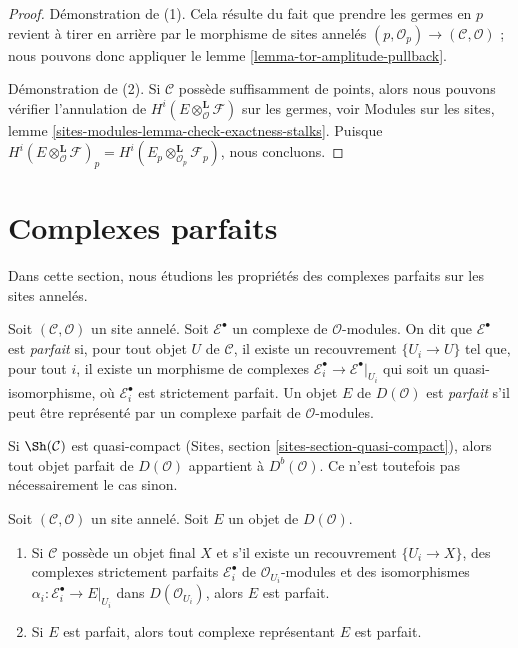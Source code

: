\begin{proof}
Démonstration de (1). Cela résulte du fait que prendre les germes en $p$
revient à tirer en arrière par le morphisme de sites annelés
$(p, \mathcal{O}_p) \to (\mathcal{C}, \mathcal{O})$ ; nous pouvons donc
appliquer le lemme \ref{lemma-tor-amplitude-pullback}.

\medskip\noindent
Démonstration de (2). Si $\mathcal{C}$ possède suffisamment de points, alors
nous pouvons vérifier l'annulation de
$H^i(E \otimes_\mathcal{O}^\mathbf{L} \mathcal{F})$
sur les germes, voir Modules sur les sites, lemme
\ref{sites-modules-lemma-check-exactness-stalks}. Puisque
$H^i(E \otimes_\mathcal{O}^\mathbf{L} \mathcal{F})_p =
H^i(E_p \otimes_{\mathcal{O}_p}^\mathbf{L} \mathcal{F}_p)$, nous concluons.
\end{proof}










\section{Complexes parfaits}
\label{section-perfect}

\noindent
Dans cette section, nous étudions les propriétés des complexes parfaits sur
les sites annelés.

\begin{definition}
\label{definition-perfect}
Soit $(\mathcal{C}, \mathcal{O})$ un site annelé. Soit
$\mathcal{E}^\bullet$ un complexe de $\mathcal{O}$-modules. On dit que
$\mathcal{E}^\bullet$ est {\it parfait} si, pour tout objet $U$ de
$\mathcal{C}$, il existe un recouvrement $\{U_i \to U\}$ tel que, pour tout
$i$, il existe un morphisme de complexes
$\mathcal{E}_i^\bullet \to \mathcal{E}^\bullet|_{U_i}$
qui soit un quasi-isomorphisme, où $\mathcal{E}_i^\bullet$ est strictement
parfait. Un objet $E$ de $D(\mathcal{O})$ est {\it parfait} s'il peut être
représenté par un complexe parfait de $\mathcal{O}$-modules.
\end{definition}

\noindent
Si $\Sh(\mathcal{C})$ est quasi-compact (Sites, section
\ref{sites-section-quasi-compact}), alors tout objet parfait de
$D(\mathcal{O})$ appartient à $D^b(\mathcal{O})$. Ce n'est toutefois pas
nécessairement le cas sinon.

\begin{lemma}
\label{lemma-perfect-independent-representative}
Soit $(\mathcal{C}, \mathcal{O})$ un site annelé.
Soit $E$ un objet de $D(\mathcal{O})$.
\begin{enumerate}
\item Si $\mathcal{C}$ possède un objet final $X$ et s'il existe un
recouvrement $\{U_i \to X\}$, des complexes strictement parfaits
$\mathcal{E}_i^\bullet$ de $\mathcal{O}_{U_i}$-modules et des isomorphismes
 $\alpha_i : \mathcal{E}_i^\bullet \to E|_{U_i}$ dans
$D(\mathcal{O}_{U_i})$, alors $E$ est parfait.
\item Si $E$ est parfait, alors tout complexe représentant $E$ est parfait.
\end{enumerate}
\end{lemma}

